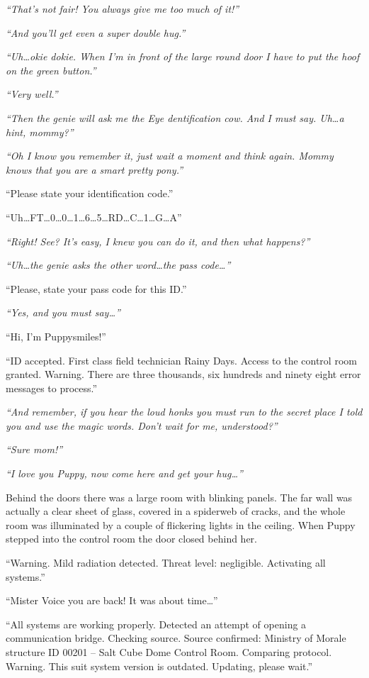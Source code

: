 \emph{``That's not fair! You always give me too much of it!''}

\emph{``And you'll get even a super double hug.''}

\emph{``Uh\dots okie dokie. When I'm in front of the large round door I have to put the hoof on the green button.''}

\emph{``Very well.''}

\emph{``Then the genie will ask me the Eye dentification cow. And I must say. Uh\dots a hint, mommy?''}

\emph{``Oh I know you remember it, just wait a moment and think again. Mommy knows that you are a smart pretty pony.''}

``{\mt Please state your identification code.}''

``Uh\dots FT\dots 0\dots 0\dots 1\dots 6\dots 5\dots RD\dots C\dots 1\dots G\dots A''

\emph{``Right! See? It's easy, I knew you can do it, and then what happens?''}

\emph{``Uh\dots the genie asks the other word\dots the pass code\dots''}

``{\mt Please, state your pass code for this ID.}''

\emph{``Yes, and you must say\dots''}

``Hi, I'm Puppysmiles!''

``{\mt ID accepted. First class field technician Rainy Days. Access to the control room granted. Warning. There are three thousands, six hundreds and ninety eight error messages to process.}''

\emph{``And remember, if you hear the loud honks you must run to the secret place I told you and use the magic words. Don't wait for me, understood?''}

\emph{``Sure mom!''}

\emph{``I love you Puppy, now come here and get your hug\dots''}


Behind the doors there was a large room with blinking panels. The far wall was actually a clear sheet of glass, covered in a spiderweb of cracks, and the whole room was illuminated by a couple of flickering lights in the ceiling. When Puppy stepped into the control room the door closed behind her.

``{\mt Warning. Mild radiation detected. Threat level: negligible. Activating all systems.}''

``Mister Voice you are back! It was about time\dots''

``{\mt All systems are working properly. Detected an attempt of opening a communication bridge. Checking source. Source confirmed: Ministry of Morale structure ID 00201 -- Salt Cube Dome Control Room. Comparing protocol. Warning. This suit system version is outdated. Updating, please wait.}''

